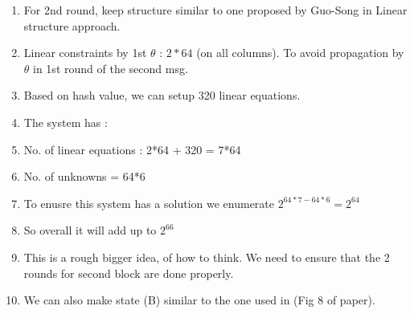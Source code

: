 \documentclass{article}
\begin{document}
\begin{enumerate}
    \item For 2nd round, keep structure similar to one proposed by Guo-Song in Linear structure approach.
    \item Linear constraints by 1st $\theta$ : $2*64$ (on all columns). To avoid propagation by $\theta$ in 1st round of the second msg.
    \item Based on hash value, we can setup 320 linear equations.
    \item The system has :
    \item No. of linear equations : 2*64 + 320 = 7*64
    \item No. of unknowns = 64*6
    \item To enusre this system has a solution we enumerate $2^{64*7-64*6} = 2^{64}$
    \item So overall it will add up to $2^{66}$
    \item This is a rough bigger idea, of how to think. We need to ensure that the 2 rounds for second block are done properly.
    \item We can also make state (B) similar to the one used in (Fig 8 of paper).
\end{enumerate}
\end{document}
